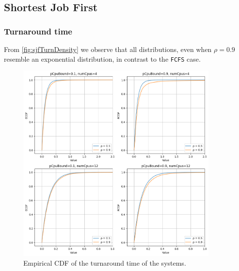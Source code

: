 
\subsection{Shortest Job First}


\subsubsection{Turnaround time}

From \cref{fig:sjfTurnDensity} we observe that all distributions, even when $\rho = 0.9$ resemble an exponential distribution, in contrast to the \texttt{FCFS} case.

\begin{figure}[H]
    \captionsetup{type=figure}
    \centering
    \includegraphics[width=0.9\textwidth]{./images/04/sjf/turn/ecdf.png}
    \caption{Empirical CDF of the turnaround time of the systems.}
    \label{fig:sjfTurnEcdf}
\end{figure}

